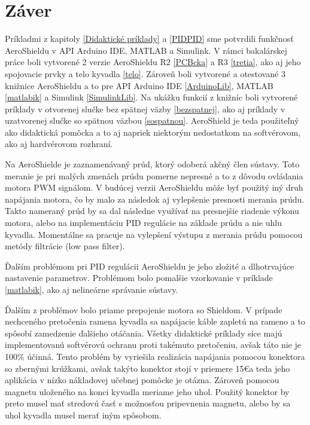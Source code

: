 \chapter{Záver}

Príkladmi z kapitoly \ref{Didaktické príklady} a \ref{PIDPID} sme potvrdili funkčnosť AeroShieldu v API Arduino IDE, MATLAB a Simulink. V rámci bakalárskej práce boli vytvorené 2 verzie AeroShieldu R2 \ref{PCBcka} a R3 \ref{tretia}, ako aj jeho spojovacie prvky a telo kyvadla \ref{telo}. Zároveň boli vytvorené a otestované 3 knižnice AeroShieldu a to pre API Arduino IDE \ref{ArduinoLib}, MATLAB \ref{matlabik} a Simulink \ref{SimulinkLib}. Na ukážku funkcií z knižníc boli vytvorené príklady v otvorenej slučke bez spätnej väzby \ref{bezspatnej}, ako aj príklady v uzatvorenej slučke so spätnou väzbou \ref{sospatnou}. AeroShield je teda použiteľný ako didaktická pomôcka a to aj napriek niektorým nedostatkom na softvérovom, ako aj hardvérovom rozhraní. 

Na AeroShielde je zaznamenávaný prúd, ktorý odoberá akčný člen sústavy. Toto meranie je pri malých zmenách prúdu pomerne nepresné a to z dôvodu ovládania motora PWM signálom. V budúcej verzii AeroShieldu môže byť použitý iný druh napájania motora, čo by malo za následok aj vylepšenie presnosti merania prúdu. Takto nameraný prúd by sa dal následne využívať na presnejšie riadenie výkonu motora, alebo na implementáciu PID regulácie na základe prúdu a nie uhlu kyvadla. Momentálne sa pracuje na vylepšení výstupu z merania prúdu pomocou metódy filtrácie (low pass filter).

Ďalším problémom pri PID regulácii AeroShieldu je jeho zložité a dlhotrvajúce nastavenie parametrov. Problémom bolo pomalšie vzorkovanie v príklade \ref{matlabik}, ako aj nelineárne správanie sústavy.

Ďalším z problémov bolo priame prepojenie motora so Shieldom. V prípade nechceného pretočenia ramena kyvadla sa napájacie káble zapletú na rameno a to spôsobí zamedzenie ďalšieho otáčania. Všetky didaktické príklady síce majú implementovanú softvérovú ochranu proti takémuto pretočeniu, avšak táto nie je 100\% účinná. 
Tento problém by vyriešila realizácia napájania pomocou konektora so zbernými krúžkami, avšak takýto konektor stojí v priemere 15\euro  a teda jeho aplikácia v nízko nákladovej učebnej pomôcke je otázna. Zároveň pomocou magnetu uloženého na konci kyvadla meriame jeho uhol. Použitý konektor by preto musel mať stredovú časť s možnosťou pripevnenia magnetu, alebo by sa uhol kyvadla musel merať iným spôsobom. 

